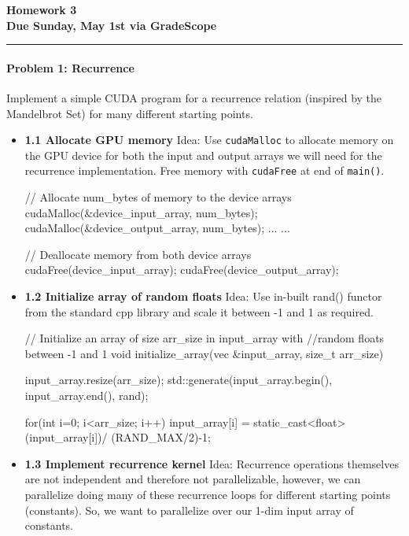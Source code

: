 \documentclass[12pt,letterpaper,twoside]{article}
\begin{document}
{\centering \textbf{Homework 3\\ Due Sunday, May 1st via GradeScope\\}}
\vspace*{-8pt}\noindent\rule{\linewidth}{1pt}

\paragraph{Problem 1: Recurrence } Implement a simple CUDA program for 
a recurrence relation (inspired by the Mandelbrot Set) for many 
different starting points.

\begin{itemize}
    \item \textbf{1.1 Allocate GPU memory} Idea: Use \texttt{cudaMalloc}
    to allocate memory on the GPU device for both the input and output 
    arrays we will need for the recurrence implementation. Free memory 
    with \texttt{cudaFree} at end of \texttt{main()}.

    \begin{cpp}
        // Allocate num_bytes of memory to the device arrays
        cudaMalloc(&device_input_array, num_bytes);
        cudaMalloc(&device_output_array, num_bytes);
        ...
        ...

        // Deallocate memory from both device arrays
        cudaFree(device_input_array);
        cudaFree(device_output_array);
    \end{cpp}

    \item \textbf{1.2 Initialize array of random floats} Idea: Use in-built
    rand() functor from the standard cpp library and scale it between -1 
    and 1 as required.

    \begin{cpp}
        // Initialize an array of size arr_size in input_array with 
        //random floats between -1 and 1
        void initialize_array(vec &input_array, size_t arr_size) {
          input_array.resize(arr_size);
          std::generate(input_array.begin(), input_array.end(), rand);
        
          for(int i=0; i<arr_size; i++){
            input_array[i] = static_cast<float>(input_array[i])/
                                (RAND_MAX/2)-1;
          }    
        }
    \end{cpp}

    \item \textbf{1.3 Implement recurrence kernel} Idea: Recurrence operations 
    themselves are not independent and therefore not parallelizable, however, 
    we can parallelize doing many of these recurrence loops for different 
    starting points (constants). So, we want to parallelize over our 1-dim 
    input array of constants.


\end{itemize}
\end{document}
